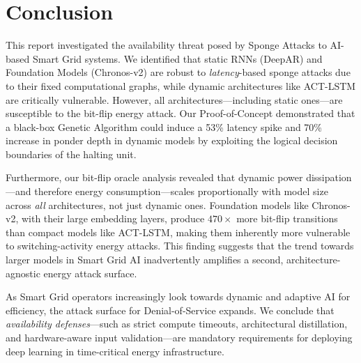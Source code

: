 \section{Conclusion}
This report investigated the availability threat posed by Sponge Attacks to AI-based Smart Grid systems. We identified that static RNNs (DeepAR) and Foundation Models (Chronos-v2) are robust to \textit{latency}-based sponge attacks due to their fixed computational graphs, while dynamic architectures like ACT-LSTM are critically vulnerable. However, all architectures—including static ones—are susceptible to the bit-flip energy attack. Our Proof-of-Concept demonstrated that a black-box Genetic Algorithm could induce a 53\% latency spike and 70\% increase in ponder depth in dynamic models by exploiting the logical decision boundaries of the halting unit.

Furthermore, our bit-flip oracle analysis revealed that dynamic power dissipation—and therefore energy consumption—scales proportionally with model size across \textit{all} architectures, not just dynamic ones. Foundation models like Chronos-v2, with their large embedding layers, produce $470\times$ more bit-flip transitions than compact models like ACT-LSTM, making them inherently more vulnerable to switching-activity energy attacks. This finding suggests that the trend towards larger models in Smart Grid AI inadvertently amplifies a second, architecture-agnostic energy attack surface.

As Smart Grid operators increasingly look towards dynamic and adaptive AI for efficiency, the attack surface for Denial-of-Service expands. We conclude that \textit{availability defenses}—such as strict compute timeouts, architectural distillation, and hardware-aware input validation—are mandatory requirements for deploying deep learning in time-critical energy infrastructure.
